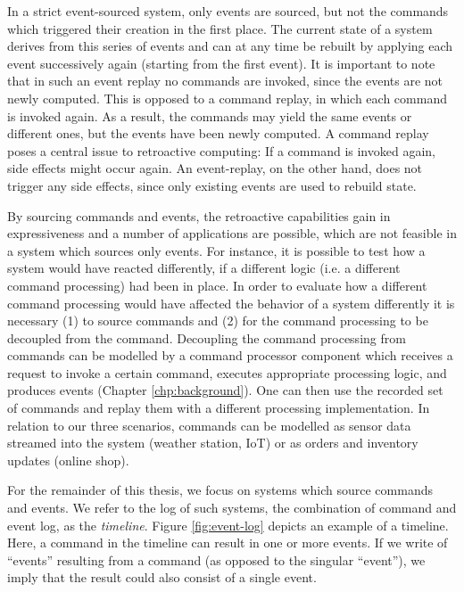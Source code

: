 In a strict event-sourced system, only events are sourced, but not the commands 
which triggered their creation in the first place. The current state of a 
system derives from this series of events and can at any time be rebuilt by 
applying each event successively again (starting from the first event). 
It is important to note that in such an event replay no commands are invoked, 
since the events are not newly computed. This is opposed to a command replay, 
in which each command is invoked again. 
As a result, the commands may yield the same events or different ones, but the 
events have been newly computed.  
A command replay poses a central issue to retroactive computing: If a command is 
invoked again, side effects might occur again. An event-replay, on the other hand, 
does not trigger any side effects, since only existing events are used to rebuild 
state.

By sourcing commands and events, the retroactive capabilities gain in 
expressiveness and a number of applications are possible, which are not feasible 
in a system which sources only events.
For instance, it is possible to test how a system would have reacted differently,
if a different logic (i.e. a different command processing) had been in place.
In order to evaluate how a different command processing would have affected 
the behavior of a system differently it is necessary (1) to source commands
and (2) for the command processing to be decoupled from the command.
Decoupling the command processing from commands can be modelled by a command
processor component which receives a request to invoke a certain command, executes 
appropriate processing logic, and produces events (Chapter \ref{chp:background}).
One can then use the recorded set of commands and replay them with a different 
processing implementation.
In relation to our three scenarios, commands can be modelled as sensor data 
streamed into the system (weather station, IoT) or as orders and inventory 
updates (online shop).

For the remainder of this thesis, we focus on systems which source commands and 
events. We refer to the log of such systems, the combination of command and event 
log, as the \emph{timeline}.
Figure \ref{fig:event-log} depicts an example of a timeline.
Here, a command in the timeline can result in one or more events. If we write of 
``events'' resulting from a command (as opposed to the singular ``event''), we imply 
that the result could also consist of a single event.

